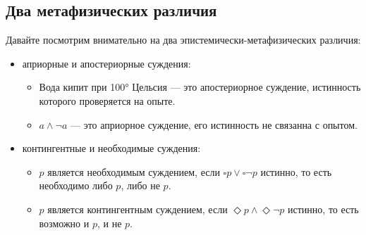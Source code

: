 \documentclass[openany]{book}
\theoremstyle{plain}
\theoremstyle{definition}
\begin{document}
\subsection{ Два метафизических различия }

Давайте посмотрим внимательно на два эпистемически-метафизических различия:
\begin{itemize}
    \item априорные и апостериорные суждения:
	\begin{itemize}
	    \item Вода кипит при 100° Цельсия --- это апостериорное суждение, истинность которого проверяется на опыте.
	    \item \(a \land \neg a\) --- это априорное суждение, его истинность не связанна с опытом.
	\end{itemize}
    \item контингентные и необходимые суждения:
	\begin{itemize}
	    \item \(p\) является необходимым суждением, если \(\square p \lor \square \neg p\) истинно, то есть необходимо либо \(p\), либо не \(p\).
	    \item \(p\) является контингентным суждением, если \(\Diamond p \land \Diamond \neg p\) истинно, то есть возможно и \(p\), и не \(p\).
	\end{itemize}
\end{itemize}    
\end{document}
